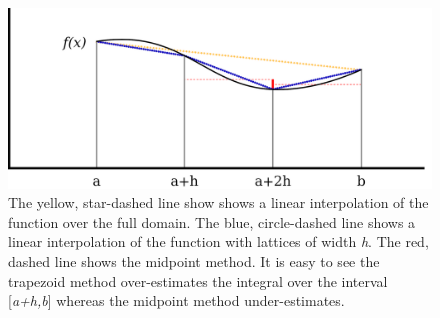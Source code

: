 \documentclass[10pt]{article}
\begin{document}
\begin{figure}[!h]
    \begin{center}
	\includegraphics[width=\columnwidth]{interpolation.png}
	\caption{The yellow, star-dashed line show shows a linear interpolation of the function over the full domain. The blue, circle-dashed line shows a linear interpolation of the function with lattices of width \textit{h}. The red, dashed line shows the midpoint method. It is easy to see the trapezoid method over-estimates the integral over the interval [\textit{a+h,b}] whereas the midpoint method under-estimates.}
	\label{fig:interpolation}
	\end{center}
\end{figure}
    
\end{document}
